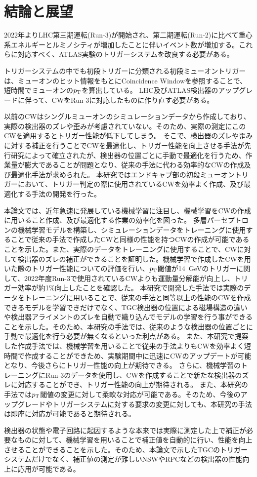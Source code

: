 \chapter{結論と展望}\label{chapter6}
2022年よりLHC第三期運転(Run-3)が開始され、第二期運転(Run-2)に比べて重心系エネルギーとルミノシティが増加したことに伴いイベント数が増加する。これらに対応すべく、ATLAS実験のトリガーシステムを改良する必要がある。

トリガーシステムの中でも初段トリガーに分類される初段ミューオントリガーは、ミューオンのヒット情報をもとにCoincidence Windowを参照することで、短時間でミューオンの$p_{\rm{T}}$を算出している。
LHC及びATLAS検出器のアップグレードに伴って、CWをRun-3に対応したものに作り直す必要がある。

以前のCWはシングルミューオンのシミュレーションデータから作成しており、実際の検出器のズレや歪みが考慮されていない。そのため、実際の測定にこのCWを適用するとトリガー性能が低下してしまう。
そこで、検出器のズレや歪みに対する補正を行うことでCWを最適化し、トリガー性能を向上させる手法が先行研究によって確立されたが、検出器の位置ごとに手動で最適化を行うため、作業量が膨大であることが問題となり、従来の手法に代わる効率的なCWの作成及び最適化手法が求められた。
本研究ではエンドキャプ部の初段ミューオントリガーにおいて、トリガー判定の際に使用されているCWを効率よく作成、及び最適化する手法の開発を行った。

本論文では、近年急速に発展している機械学習に注目し、機械学習をCWの作成に用いること作成、及び最適化する作業の効率化を図った。
多層パーセプトロンの機械学習モデルを構築し、シミュレーションデータをトレーニングに使用することで従来の手法で作成したCWと同様の性能を持つCWの作成が可能であることを示した。また、実際のデータをトレーニングに使用することで、CWに対して検出器のズレの補正ができることを証明した。機械学習で作成したCWを用いた際のトリガー性能についての評価を行い、$p_{\rm{T}}$閾値が14~GeVのトリガーに関して、2022年度Run-3で使用されているCWよりも運動量分解能が向上し、トリガー効率が約1$\%$向上したことを確認した。
本研究で開発した手法では実際のデータをトレーニングに用いることで、従来の手法と同等以上の性能のCWを作成できるモデルを学習できだけでなく、TGC検出器の位置による磁場構造の違いや検出器アライメントのズレを自動で織り込んでモデルの学習を行う事ができることを示した。そのため、本研究の手法では、従来のような検出器の位置ごとに手動で最適化を行う必要が無くなるといった利点がある。
また、本研究で提案した作成手法では、機械学習を用いることで従来の手法よりもCWを効率よく短時間で作成することができため、実験期間中に迅速にCWのアップデートが可能となり、今後さらにトリガー性能の向上が期待できる。
さらに、機械学習のトレーニングにRun-3のデータを使用し、CWを作成することで新たな検出器のズレに対応することができ、トリガー性能の向上が期待される。
また、本研究の手法では$p_{\rm{T}}$閾値の変更に対して柔軟な対応が可能である。そのため、今後のアップグレードやトリガーシステムに対する要求の変更に対しても、本研究の手法は即座に対応が可能であると期待される。

検出器の状態や電子回路に起因するような本来では実際に測定した上で補正が必要なものに対して、機械学習を用いることで補正値を自動的に行い、性能を向上させることができることを示した。そのため、本論文で示したTGCのトリガーシステムだけでなく、補正値の測定が難しいNSWやRPCなどの検出器の性能向上に応用が可能である。

